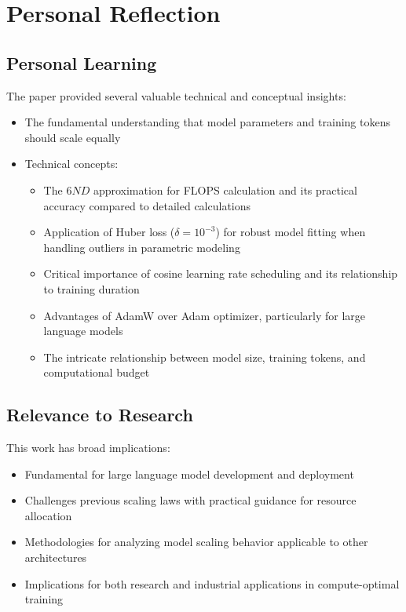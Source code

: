 \documentclass{article}
\begin{document}
\section{Personal Reflection}

\subsection{Personal Learning}
The paper provided several valuable technical and conceptual insights:
\begin{itemize}
    \item The fundamental understanding that model parameters and training tokens should scale equally
    \item Technical concepts:
    \begin{itemize}
        \item The $6ND$ approximation for FLOPS calculation and its practical accuracy compared to detailed calculations
        \item Application of Huber loss ($\delta = 10^{-3}$) for robust model fitting when handling outliers in parametric modeling
        \item Critical importance of cosine learning rate scheduling and its relationship to training duration
        \item Advantages of AdamW over Adam optimizer, particularly for large language models
        \item The intricate relationship between model size, training tokens, and computational budget
    \end{itemize}
\end{itemize}

\subsection{Relevance to Research}
This work has broad implications:
\begin{itemize}
    \item Fundamental for large language model development and deployment
    \item Challenges previous scaling laws with practical guidance for resource allocation
    \item Methodologies for analyzing model scaling behavior applicable to other architectures
    \item Implications for both research and industrial applications in compute-optimal training
\end{itemize}
\end{document}
